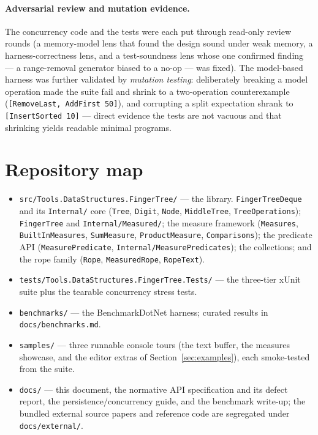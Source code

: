 \documentclass[11pt]{article}
\newcommand{\cs}[1]{\lstinline|#1|}
\begin{document}
\paragraph{Adversarial review and mutation evidence.} The concurrency code and the tests were each put
through read-only review rounds (a memory-model lens that found the design sound under weak memory, a
harness-correctness lens, and a test-soundness lens whose one confirmed finding --- a range-removal
generator biased to a no-op --- was fixed). The model-based harness was further validated by
\emph{mutation testing}: deliberately breaking a model operation made the suite fail and shrink to a
two-operation counterexample (\cs{[RemoveLast, AddFirst 50]}), and corrupting a split expectation shrank
to \cs{[InsertSorted 10]} --- direct evidence the tests are not vacuous and that shrinking yields
readable minimal programs.

\section{Repository map}
\label{sec:map}

\begin{itemize}[leftmargin=1.4em, itemsep=1pt]
  \item \texttt{src/Tools.DataStructures.FingerTree/} --- the library. \cs{FingerTreeDeque} and its
    \texttt{Internal/} core (\cs{Tree}, \cs{Digit}, \cs{Node}, \cs{MiddleTree}, \cs{TreeOperations});
    \cs{FingerTree} and \texttt{Internal/Measured/}; the measure framework (\cs{Measures},
    \cs{BuiltInMeasures}, \cs{SumMeasure}, \cs{ProductMeasure}, \cs{Comparisons}); the predicate API
    (\cs{MeasurePredicate}, \cs{Internal/MeasurePredicates}); the collections; and the rope family
    (\cs{Rope}, \cs{MeasuredRope}, \cs{RopeText}).
  \item \texttt{tests/Tools.DataStructures.FingerTree.Tests/} --- the three-tier xUnit suite plus the
    tearable concurrency stress tests.
  \item \texttt{benchmarks/} --- the BenchmarkDotNet harness; curated results in
    \texttt{docs/benchmarks.md}.
  \item \texttt{samples/} --- three runnable console tours (the text buffer, the measures showcase, and the
    editor extras of Section~\ref{sec:examples}), each smoke-tested from the suite.
  \item \texttt{docs/} --- this document, the normative API specification and its defect report, the
    persistence/concurrency guide, and the benchmark write-up; the bundled external source papers and
    reference code are segregated under \texttt{docs/external/}.
\end{itemize}
\end{document}
